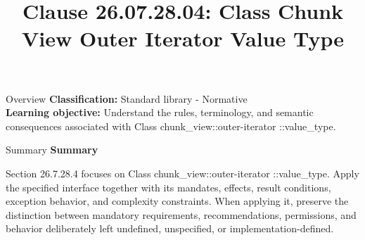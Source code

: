 \documentclass[10pt,letterpaper]{article}
\title{Clause 26.07.28.04: Class Chunk View Outer Iterator Value Type}
\author{}
\date{}
\begin{document}
\maketitle
\begin{CornellOverviewBox}{Overview}
\textbf{Classification:} Standard library - Normative\\[2pt]
\textbf{Learning objective:} Understand the rules, terminology, and semantic consequences associated with Class chunk\_view::outer-iterator ::value\_type.
\end{CornellOverviewBox}\begin{CornellSummaryBox}{Summary}
{\sffamily\bfseries\color{Accent} Summary}\par\vspace{3pt}Section 26.7.28.4 focuses on Class chunk\_view::outer-iterator ::value\_type. Apply the specified interface together with its mandates, effects, result conditions, exception behavior, and complexity constraints. When applying it, preserve the distinction between mandatory requirements, recommendations, permissions, and behavior deliberately left undefined, unspecified, or implementation-defined.
\end{CornellSummaryBox}
\end{document}
